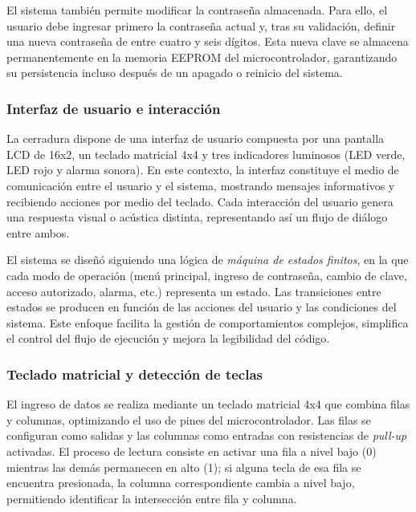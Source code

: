 El sistema también permite modificar la contraseña almacenada. Para ello, el usuario debe ingresar primero la contraseña actual y, tras su validación, definir una nueva contraseña de entre cuatro y seis dígitos. Esta nueva clave se almacena permanentemente en la memoria EEPROM del microcontrolador, garantizando su persistencia incluso después de un apagado o reinicio del sistema.

\vspace{1em}

\subsubsection{Interfaz de usuario e interacción}

La cerradura dispone de una interfaz de usuario compuesta por una pantalla LCD de 16x2, un teclado matricial 4x4 y tres indicadores luminosos (LED verde, LED rojo y alarma sonora). En este contexto, la interfaz constituye el medio de comunicación entre el usuario y el sistema, mostrando mensajes informativos y recibiendo acciones por medio del teclado. Cada interacción del usuario genera una respuesta visual o acústica distinta, representando así un flujo de diálogo entre ambos.

El sistema se diseñó siguiendo una lógica de \textit{máquina de estados finitos}, en la que cada modo de operación (menú principal, ingreso de contraseña, cambio de clave, acceso autorizado, alarma, etc.) representa un estado. Las transiciones entre estados se producen en función de las acciones del usuario y las condiciones del sistema. Este enfoque facilita la gestión de comportamientos complejos, simplifica el control del flujo de ejecución y mejora la legibilidad del código.

\vspace{1em}

\subsubsection{Teclado matricial y detección de teclas}

El ingreso de datos se realiza mediante un teclado matricial 4x4 que combina filas y columnas, optimizando el uso de pines del microcontrolador. Las filas se configuran como salidas y las columnas como entradas con resistencias de \textit{pull-up} activadas. El proceso de lectura consiste en activar una fila a nivel bajo (0) mientras las demás permanecen en alto (1); si alguna tecla de esa fila se encuentra presionada, la columna correspondiente cambia a nivel bajo, permitiendo identificar la intersección entre fila y columna.  

